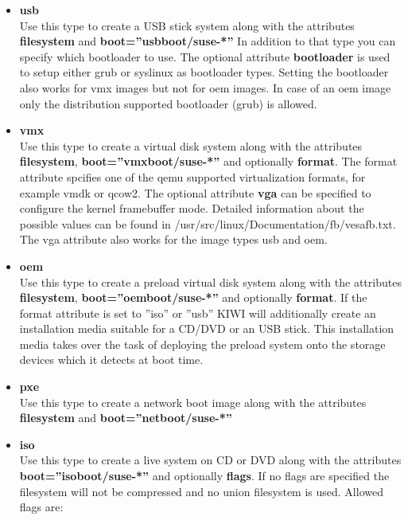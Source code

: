 \begin{itemize}
\item \textbf{usb}\\
      Use this type to create a USB stick system along with the
      attributes \textbf{filesystem} and \textbf{boot=''usbboot/suse-*''}
      In addition to that type you can specify which bootloader to use.
      The optional attribute \textbf{bootloader} is used to setup
      either grub or syslinux as bootloader types. Setting the bootloader
      also works for vmx images but not for oem images. In case of an
      oem image only the distribution supported bootloader (grub) is
      allowed.
\item \textbf{vmx}\\
      Use this type to create a virtual disk system along with the
      attributes \textbf{filesystem}, \textbf{boot=''vmxboot/suse-*''} and
      optionally \textbf{format}. The format attribute spcifies one of
      the qemu supported virtualization formats, for example vmdk or qcow2.
      The optional attribute \textbf{vga} can be specified to configure the
      kernel framebuffer mode. Detailed information about the possible
      values can be found in /usr/src/linux/Documentation/fb/vesafb.txt.
      The vga attribute also works for the image types usb and oem.
\item \textbf{oem}\\
      Use this type to create a preload virtual disk system along with
      the attributes \textbf{filesystem}, \textbf{boot=''oemboot/suse-*''} and
      optionally \textbf{format}. If the format attribute is set to
      ''iso'' or ''usb'' KIWI will additionally create an installation
      media suitable for a CD/DVD or an USB stick. This installation media
      takes over the task of deploying the preload system onto the
      storage devices which it detects at boot time.
\item \textbf{pxe}\\
      Use this type to create a network boot image along with the
      attributes \textbf{filesystem} and \textbf{boot=''netboot/suse-*''}
\item \textbf{iso}\\
      Use this type to create a live system on CD or DVD along with
      the attributes \textbf{boot=''isoboot/suse-*''} and optionally
      \textbf{flags}. If no flags are specified the filesystem will not
      be compressed and no union filesystem is used. Allowed flags are:
      \begin{itemize}

\end{itemize}
\end{itemize}
